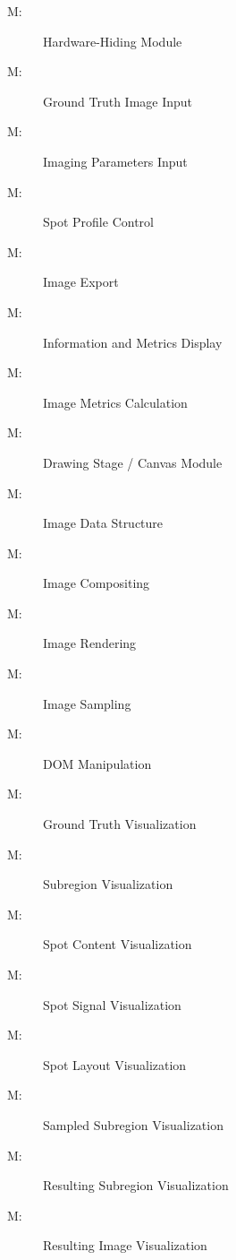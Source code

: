 \documentclass[12pt, titlepage]{article}
\newcounter{mnum}
\newcommand{\mthemnum}{M\themnum}
\begin{document}
\begin{description}
\item [ \mthemnum \label{M_HdwHide}:] Hardware-Hiding Module
\item [ \mthemnum \label{M_imgGTInput}:] Ground Truth Image Input
\item [ \mthemnum \label{M_params}:] Imaging Parameters Input
\item [ \mthemnum \label{M_vizSpotProfile}:] Spot Profile Control
\item [ \mthemnum \label{M_export}:] Image Export
\item [ \mthemnum \label{M_infoDisp}:] Information and Metrics Display
\item [ \mthemnum \label{M_metric}:] Image Metrics Calculation
\item [ \mthemnum \label{M_drawStage}:] Drawing Stage / Canvas Module
\item [ \mthemnum \label{M_imgDataStruct}:] Image Data Structure
\item [ \mthemnum \label{M_compositing}:] Image Compositing
\item [ \mthemnum \label{M_rendering}:] Image Rendering
\item [ \mthemnum \label{M_sampling}:] Image Sampling
\item [ \mthemnum \label{M_DOM}:] DOM Manipulation
\item [ \mthemnum \label{M_vizGT}:] Ground Truth Visualization
\item [ \mthemnum \label{M_vizSubregion}:] Subregion Visualization
\item [ \mthemnum \label{M_vizSpotContent}:] Spot Content Visualization
\item [ \mthemnum \label{M_vizSpotSignal}:] Spot Signal Visualization
\item [ \mthemnum \label{M_vizSpotLayout}:] Spot Layout Visualization
\item [ \mthemnum \label{M_vizSampledSub}:] Sampled Subregion Visualization
\item [ \mthemnum \label{M_vizResultSub}:] Resulting Subregion Visualization
\item [ \mthemnum \label{M_vizResultImg}:] Resulting Image Visualization
\end{description}
\end{document}
